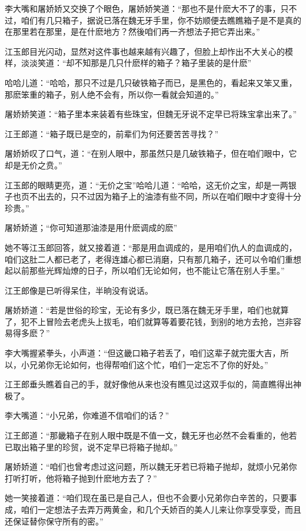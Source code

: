 \documentclass[12pt,oneside]{book}
\begin{document}
李大嘴和屠娇娇又交换了个眼色，屠娇娇笑道：``那也不是什麽大不了的事，只不过，咱们有几只箱子，据说已落在魏无牙手里，你不妨顺便去瞧瞧箱子是不是真的在那里若在那里，是在什麽地方？然後咱们再一齐想法子把它弄出来。''

江玉郎目光闪动，显然对这件事也越来越有兴趣了，但脸上却怍出不大关心的模样，淡淡笑道：``却不知那是几只什麽样的箱子？箱子里装的是什麽''

哈哈儿道：``哈哈，那只不过是几只破铁箱子而已，是黑色的，看起来又笨又重，那麽笨重的箱子，别人绝不会有，所以你一看就会知道的。''

屠娇娇笑道：``箱子里本来装着有些珠宝，但魏无牙说不定早已将珠宝拿出来了。''

江王郎道：``箱子既已是空的，前辈们为何还要苦苦寻找？''

屠娇娇叹了口气，道：``在别人眼中，那虽然只是几破铁箱子，但在咱们眼中，它却是无价之贲。''

江玉郎的眼睛更亮，道：``无价之宝''哈哈儿道：``哈哈，这无价之宝，却是一两银子也页不出去的，只不过因为箱子上的油漆有些不同，所以在咱们眼中才变得十分珍贵。''

屠娇娇道；``你可知道那油漆是用什麽调成的麽''

她不等江玉郎回答，就又接着道：``那是用血调成的，是用咱们仇人的血调成的，咱们这肚二人都已老了，老得连雄心都已消磨，只有那几箱子，还可以令咱们重想起以前那些光辉灿燎的日子，所以咱们无论如何，也不能让它落在别人手里。''

江王郎像是已听得呆住，半晌没有说话。

屠娇娇道：``若是世俗的珍宝，无论有多少，既已落在魏无牙手里，咱们也就算了，犯不上冒险去老虎头上拔毛，咱们就算等着要花钱，到别的地方去抢，岂非容易得多麽？''

李大嘴握紧拳头，小声道：``但这畿口箱子若丢了，咱们这辈子就完蛋大吉，所以，小兄弟你无论如何，也得帮咱们这个忙，咱们一定忘不了你的好处。''

江王郎垂头瞧着自己的手，就好像他从来也没有瞧见过这双手似的，简直瞧得出神极了。

李大嘴道：``小兄弟，你难道不信咱们的话？''

江王郎道：``那畿箱子在别人眼中既是不值一文，魏无牙也必然不会看重的，他若已取出箱子里的珍贸，说不定早已将箱子抛却。''

屠娇娇道：``咱们也曾考虑过这问题，所以魏无牙若已将箱子抛却，就烦小兄弟你打听打听，他将箱子抛到什麽地方去了？''

她一笑接着道：``咱们现在虽已是自己人，但也不会要小兄弟你白辛苦的，只要事成，咱们一定想法子去弄万两黄金，和几个夭娇百的美人儿来让你享受享受，而且还保证替你保守所有的密。''
\end{document}
